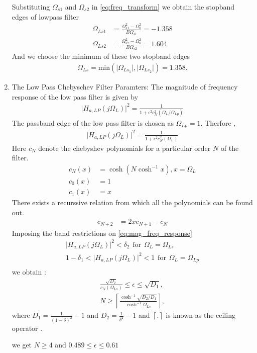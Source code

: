 \documentclass{article}
\begin{document}
\begin{enumerate}
Substituting $\Omega_{s1}$ and $\Omega_{s2}$ in \eqref{eq:freq_transform} we obtain the stopband edges of lowpass filter 
\begin{align}
    \Omega_{Ls1} &= \frac{\Omega_{s1}^2 - \Omega_0^2}{B\Omega_{s1}} = -1.358\\
    \Omega_{Ls2} &= \frac{\Omega_{s2}^2 - \Omega_0^2}{B\Omega_{s2}} = 1.604
\end{align}
And we choose the minimum of these two stopband edges
\begin{align}
    \Omega_{Ls} = \mbox{min}(\vert \Omega_{Ls_1}\vert,\vert \Omega_{Ls_2}\vert) = 1.358.
\end{align}
\item {The Low Pass Chebyschev Filter Paramters:} The magnitude of frequency response of the low pass filter is given by 
\begin{align}
    \vert H_{a,LP}(j\Omega_L)\vert^2 = \frac{1}{1 + \epsilon^2c_N^2(\Omega_L/\Omega_{Lp})} \label{eq:mag_freq_response}
\end{align}
The passband edge of the low pass filter is chosen as $\Omega_{Lp}=1$.
Therfore ,
\begin{align}
    \vert H_{a,LP}(j\Omega_L)\vert^2 = \frac{1}{1 + \epsilon^2c_N^2(\Omega_L)} \label{eq:specification}
\end{align}
Here $c_N$ denote the chebyshev polynomials for a particular order $N$ of the filter.
\begin{align}
    c_N(x) &= \cosh(N \cosh^{-1}x) , x=\Omega_{L}\\
    c_0(x) &= 1 \\
    c_1(x) &= x
\end{align}
There exists a recurssive relation from which all the polynomials can be found out.
\begin{align}
    c_{N+2} &= 2xc_{N+1} - c_{N}  \label{eq:cheby_poly_relation}
\end{align}
Imposing the band restrictions on \eqref{eq:mag_freq_response} \\
\begin{align}
    \vert H_{a,LP}(j\Omega_L)\vert^2 < \delta_{2} \hspace{5pt} \text{for}\hspace{5pt} \Omega_L = \Omega_{Ls}\\
    1-\delta_{1}<\vert H_{a,LP}(j\Omega_L)\vert^2 < 1 \hspace{5pt} \text{for}\hspace{5pt} \Omega_L = \Omega_{Lp}\\
\end{align}
we obtain :
\begin{eqnarray}
\label{lpdesign}
\frac{\sqrt{D_2}}{c_N(\Omega_{Ls})} \leq \epsilon \leq \sqrt{D_1}, \nonumber \\
N \geq \left\lceil \frac{\cosh^{-1}\sqrt{D_2/D_1}}{\cosh^{-1}\Omega_{Ls}} \right\rceil,
\end{eqnarray}
where $D_1 = \frac{1}{(1 - \delta)^2}-1$ and $D_2 = \frac{1}{\delta^2} - 1$ and $\left \lceil . \right \rceil$ is known as the ceiling operator . 

we get $N\geq 4$ and $0.489 \leq \epsilon \leq 0.61$\\
\newpage



\end{enumerate}
\end{document}
